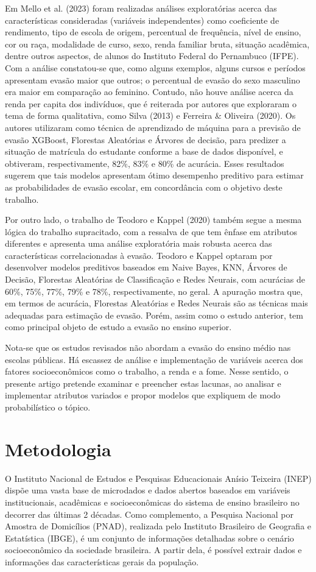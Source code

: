 \documentclass[english, spanish, brazilian]{RBIEarticle} %
\begin{document}
Em Mello et al. (2023) foram realizadas análises exploratórias acerca das características consideradas (variáveis independentes) como coeficiente de rendimento, tipo de escola de origem, percentual de frequência, nível de ensino, cor ou raça, modalidade de curso, sexo, renda familiar bruta, situação acadêmica, dentre outros aspectos, de alunos do Instituto Federal do Pernambuco (IFPE). Com a análise constatou-se que, como alguns exemplos, alguns cursos e períodos apresentam evasão maior que outros; o percentual de evasão do sexo masculino era maior em comparação ao feminino. Contudo, não houve análise acerca da renda per capita dos indivíduos, que é reiterada por autores que exploraram o tema de forma qualitativa, como Silva (2013) e Ferreira \& Oliveira (2020). Os autores utilizaram como técnica de aprendizado de máquina para a previsão de evasão XGBoost, Florestas Aleatórias e Árvores de decisão, para predizer a situação de matrícula do estudante conforme a base de dados disponível, e obtiveram, respectivamente, 82\%, 83\% e 80\% de acurácia. Esses resultados sugerem que tais modelos apresentam ótimo desempenho preditivo para estimar as probabilidades de evasão escolar, em concordância com o objetivo deste trabalho.

Por outro lado, o trabalho de Teodoro e Kappel (2020) também segue a mesma lógica do trabalho supracitado, com a ressalva de que tem ênfase em atributos diferentes e apresenta uma análise exploratória mais robusta acerca das características correlacionadas à evasão. Teodoro e Kappel optaram por desenvolver modelos preditivos baseados em Naive Bayes, KNN, Árvores de Decisão, Florestas Aleatórias de Classificação e Redes Neurais, com acurácias de 60\%, 75\%, 77\%, 79\% e 78\%, respectivamente, no geral. A apuração mostra que, em termos de acurácia, Florestas Aleatórias e Redes Neurais são as técnicas mais adequadas para estimação de evasão. Porém, assim como o estudo anterior, tem como principal objeto de estudo a evasão no ensino superior.  

Nota-se que os estudos revisados não abordam a evasão do ensino médio nas escolas públicas. Há escassez de análise e implementação de variáveis acerca dos fatores socioeconômicos como o trabalho, a renda e a fome. Nesse sentido, o presente artigo pretende examinar e preencher estas lacunas, ao analisar e implementar atributos variados e propor modelos que expliquem de modo probabilístico o tópico.

\section{Metodologia}
O Instituto Nacional de Estudos e Pesquisas Educacionais Anísio Teixeira (INEP) dispõe uma vasta base de microdados e dados abertos baseados em variáveis institucionais, acadêmicas e socioeconômicas do sistema de ensino brasileiro no decorrer das últimas 2 décadas. Como complemento, a Pesquisa Nacional por Amostra de Domicílios (PNAD), realizada pelo Instituto Brasileiro de Geografia e Estatística (IBGE), é um conjunto de informações detalhadas sobre o cenário socioeconômico da sociedade brasileira. A partir dela, é possível extrair dados e informações das características gerais da população.  
\end{document}
